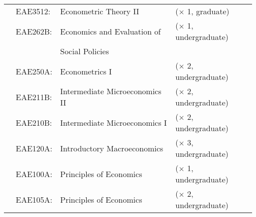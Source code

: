 \begin{tabular}{llll}
	  
	  \indent
	& EAE3512:
	& Econometric Theory II
	& ($\times$ 1, graduate)
	\\%
	
	& EAE262B:
	& Economics and Evaluation of
	& ($\times$ 1, undergraduate)
	\\%
	
	& 
	& Social Policies
	& 
	\\%
	
	& EAE250A:
	& Econometrics I
	& ($\times$ 2, undergraduate)
	\\%
	
	& EAE211B:
	& Intermediate Microeconomics II
	& ($\times$ 2, undergraduate)
	\\%
	
	& EAE210B:
	& Intermediate Microeconomics I
	& ($\times$ 2, undergraduate)
	\\%
	
	& EAE120A:
	& Introductory Macroeconomics
	& ($\times$ 3, undergraduate)
	\\%
	
	& EAE100A:
	& Principles of Economics
	& ($\times$ 1, undergraduate)
	\\%
	
	& EAE105A:
	& Principles of Economics
	& ($\times$ 2, undergraduate)
	\\%
	
\end{tabular}

